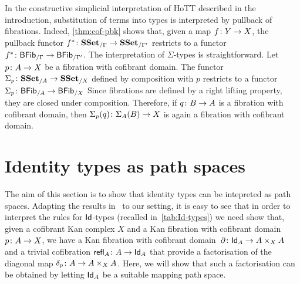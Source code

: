 \documentclass[reqno,10pt,a4paper,oneside,draft]{amsart}
\begin{document}
\begin{remark} 
In the constructive simplicial interpretation of HoTT described in the introduction, substitution of terms into types 
is interpreted by pullback of fibrations. Indeed, \cref{thm:cof-pbk} shows that, given a map $f \colon Y \to X$,  the pullback functor $f^* \colon \mathbf{SSet}_{/\Gamma} \to \mathbf{SSet}_{/\Gamma'}$ restricts to a functor $f^* \colon \mathsf{BFib}_{/\Gamma}  \to \mathsf{BFib}_{/\Gamma'}$. The interpretation of $\Sigma$-types is straightforward. 
Let  $p \colon A \to X$ be a fibration with cofibrant domain. The
functor~$\Sigma_p \colon \mathbf{SSet}_{/A} \to \mathbf{SSet}_{/X}$ defined by
composition with $p$ restricts to a functor
$\Sigma_p \colon \mathsf{BFib}_{/A}  \to \mathsf{BFib}_{/X}$
 Since fibrations are defined by a right lifting property, they are closed
under composition. Therefore, if $q \colon B \to A$ is a fibration with cofibrant domain, then
$\Sigma_p(q) \colon \Sigma_A(B) \to X$ is again a fibration with cofibrant domain.
\end{remark} 



\section{Identity types as path spaces}
\label{sec:pats}

The aim of this section is to show that identity types can be intepreted as path spaces. Adapting
the results in~\cite{awodey-warren:homotopy-idtype} to our setting, it is easy to see that 
 in order to interpret the rules for $\mathsf{Id}$-types (recalled in~\cref{tab:Id-types}) we need show that, given a  cofibrant Kan complex $X$ and a Kan fibration with cofibrant domain $p \colon A \to X$,
we have a Kan fibration with cofibrant domain~$\partial \colon \mathsf{Id}_A \to A \times_X A$ and a trivial cofibration
$\mathsf{refl}_A \colon A \to \mathsf{Id}_A$ that provide a factorisation of the diagonal map $\delta_p \colon A \to A \times_X A$. Here, we will show that such a factorisation can be obtained by letting $\mathsf{Id}_A$ be a suitable mapping path space. 
\end{document}
